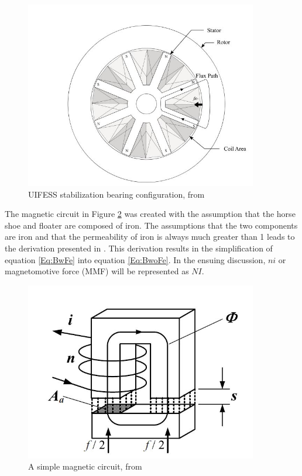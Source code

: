 \begin{figure}[h]
	\centering
	\includegraphics[width=4in]{./Pictures/StabB.jpg}
	\caption{UIFESS stabilization bearing configuration, from \cite{Kisling}}
	\label{fig:StabB}
\end{figure}

The magnetic circuit in Figure \ref{fig:SimpleMagneticCircuit} was created with the assumption that the horse shoe and floater are composed of iron. The assumptions that the two components are iron and that the permeability of iron is always much greater than 1 leads to the derivation presented in \cite{Wimer}. This derivation results in the simplification of equation \ref{Eq:BwFe} into equation \ref{Eq:BwoFe}. In the ensuing discussion, $ni$ or magnetomotive force (MMF) will be represented as $NI$.

\begin{figure}[!t]
	\centering
	\includegraphics[width=4in]{./Pictures/SimpleMagneticCircuit.jpg}
	\caption{A simple magnetic circuit, from \cite{MagBear}}
	\label{fig:SimpleMagneticCircuit}
\end{figure}

